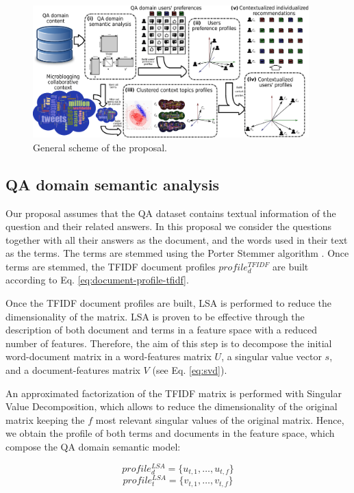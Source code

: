 \documentclass[preprint]{elsarticle}
\begin{document}
\begin{spacing}{1.5}
\begin{figure}[h]
	\centering
	\includegraphics[width=0.95\textwidth]{figures/proposal-scheme-v5.eps}
	\caption{General scheme of the proposal.}
	\label{fig:proposal-scheme}
\end{figure}

\subsection{QA domain semantic analysis}
\label{sec:proposal-qa-semantic-analysis}

Our proposal assumes that the QA dataset contains textual information of the question and their related answers. In this proposal we consider the questions together with all their answers as the document, and the words used in their text as the terms. The terms are stemmed using the Porter Stemmer algorithm \citep{Porter1980}. Once terms are stemmed, the TFIDF document profiles $profile^{TFIDF}_{d}$ are built according to Eq. \ref{eq:document-profile-tfidf}.

Once the TFIDF document profiles are built, LSA is performed to reduce the dimensionality of the matrix. LSA is proven to be effective through the description of both document and terms in a feature space with a reduced number of features. Therefore, the aim of this step is to decompose the initial word-document matrix in a word-features matrix $U$, a singular value vector $s$, and a document-features matrix $V$ (see Eq. \ref{eq:svd}).

An approximated factorization of the TFIDF matrix is performed with Singular Value Decomposition, which allows to reduce the dimensionality of the original matrix keeping the $f$ most relevant singular values of the original matrix. Hence, we obtain the profile of both terms and documents in the feature space, which compose the QA domain semantic model:

\begin{equation}
	profile^{LSA}_d = \{ u_{t,1},\dots, u_{t,f}\}
\end{equation}
\begin{equation}
	profile^{LSA}_t = \{ v_{t,1},\dots, v_{t,f}\}
\end{equation}


\end{spacing}
\end{document}
